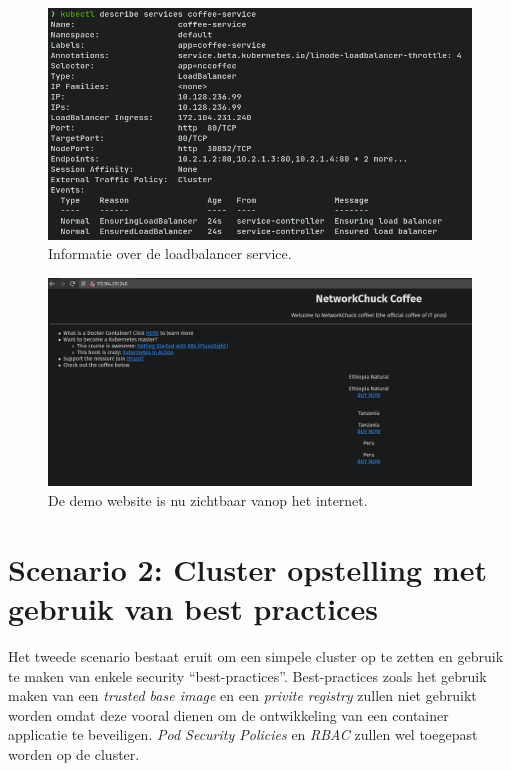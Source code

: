 \begin{figure}[h]
	\centering
	\includegraphics[width=\linewidth]{img/kubectlDescriveService1.png}
	\caption{Informatie over de loadbalancer service.}
	\label{fig:kubectlDescriveService1}
\end{figure}

\begin{figure}[h]
	\centering
	\includegraphics[width=\linewidth]{img/demoSite1.png}
	\caption{De demo website is nu zichtbaar vanop het internet.}
	\label{fig:demoSite1}
\end{figure}

\clearpage
\section{Scenario 2: Cluster opstelling met gebruik van best practices}
Het tweede scenario bestaat eruit om een simpele cluster op te zetten en gebruik te maken van enkele security ``best-practices''. Best-practices zoals het gebruik maken van een \textit{trusted base image} en een \textit{privite registry} zullen niet gebruikt worden omdat deze vooral dienen om de ontwikkeling van een container applicatie te beveiligen. \textit{Pod Security Policies} en \textit{RBAC} zullen wel toegepast worden op de cluster. 

